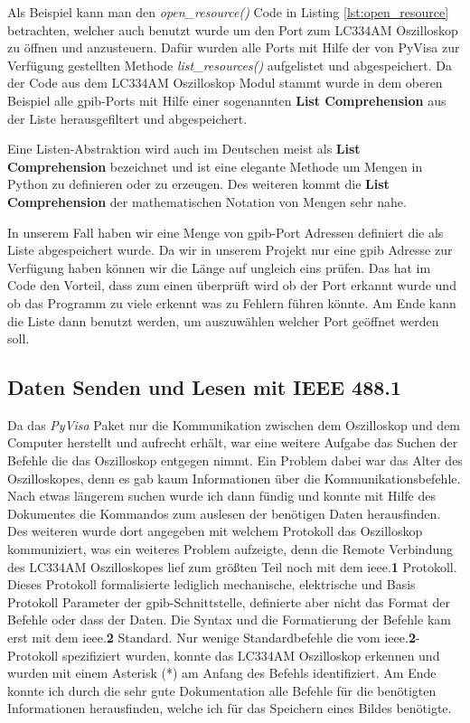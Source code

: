 
Als Beispiel kann man den \textit{open\_resource()} Code in Listing \ref{lst:open_resource} 
betrachten, welcher auch benutzt wurde um den Port zum LC334AM Oszilloskop zu öffnen und 
anzusteuern. Dafür wurden alle Ports mit Hilfe der von PyVisa zur Verfügung gestellten Methode 
\textit{list\_resources()} aufgelistet und abgespeichert. 
Da der Code aus dem LC334AM Oszilloskop Modul stammt wurde in dem oberen Beispiel alle 
\ac{gpib}-Ports mit Hilfe einer sogenannten \textbf{List Comprehension} aus der Liste 
herausgefiltert und abgespeichert. 

Eine Listen-Abstraktion wird auch im Deutschen meist als \textbf{List Comprehension} bezeichnet 
und ist eine elegante Methode um Mengen in Python zu definieren oder zu erzeugen. Des weiteren 
kommt die \textbf{List Comprehension} der mathematischen Notation von Mengen sehr nahe. 

In unserem Fall haben wir eine Menge von \ac{gpib}-Port Adressen definiert die als Liste 
abgespeichert wurde. Da wir in unserem Projekt nur eine \ac{gpib} Adresse zur Verfügung haben  können wir die Länge auf ungleich eins prüfen. Das hat im Code den Vorteil, dass zum 
einen überprüft wird ob der Port erkannt wurde und ob das Programm zu viele erkennt was zu 
Fehlern führen könnte. Am Ende kann die Liste dann benutzt werden, um auszuwählen welcher Port 
geöffnet werden soll. 

\subsection{Daten Senden und Lesen mit IEEE 488.1}
\label{subsec:send_receive}

Da das \textit{PyVisa} Paket nur die Kommunikation zwischen dem Oszilloskop und dem Computer herstellt und aufrecht erhält, war eine weitere Aufgabe das Suchen der Befehle die das Oszilloskop entgegen nimmt. Ein Problem dabei war das Alter des Oszilloskopes, denn es gab kaum Informationen über die Kommunikationsbefehle. Nach etwas längerem suchen wurde ich dann fündig und konnte mit Hilfe des Dokumentes  die Kommandos zum auslesen der benötigen Daten herausfinden. Des weiteren wurde dort angegeben mit welchem Protokoll das Oszilloskop kommuniziert, was ein weiteres Problem aufzeigte, denn die Remote Verbindung des LC334AM Oszilloskopes lief zum größten Teil noch mit dem \ac{ieee}.\textbf{1} Protokoll. Dieses Protokoll formalisierte lediglich mechanische, elektrische und Basis Protokoll Parameter der \ac{gpib}-Schnittstelle, definierte aber nicht das Format der Befehle oder dass der Daten. Die Syntax und die Formatierung der Befehle kam erst mit dem \ac{ieee}.\textbf{2} Standard. Nur wenige Standardbefehle die vom \ac{ieee}.\textbf{2}-Protokoll spezifiziert wurden, konnte das LC334AM Oszilloskop erkennen und wurden mit einem Asterisk (*) am Anfang des Befehls identifiziert. Am Ende konnte ich durch die sehr gute Dokumentation alle Befehle für die benötigten Informationen herausfinden, welche ich für das Speichern eines Bildes benötigte.


